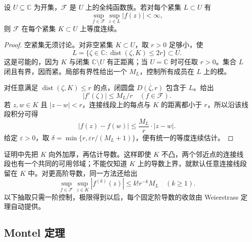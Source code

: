 \begin{lemma}\label{b3:lem:04-equicontinuity}
设 \(U\subseteq\mathbb C\) 为开集，\(\mathcal F\) 是 \(U\) 上的全纯函数族。若对每个紧集 \(L\subset U\) 有
\[
 \sup_{f\in\mathcal F}\sup_{z\in L}|f(z)|<\infty,
\]
则 \(\mathcal F\) 在每个紧集 \(K\subset U\) 上等度连续。
\end{lemma}
\begin{proof}
空紧集无须讨论。对非空紧集 \(K\subset U\)，取 \(r>0\) 足够小，使
\[
 L=\{\zeta\in\mathbb C:\operatorname{dist}(\zeta,K)\le2r\}
 \subset U.
\]
这是可能的，因为 \(K\) 与闭集 \(\mathbb C\setminus U\) 有正距离；当 \(U=\mathbb C\) 时可任取 \(r>0\)。集合 \(L\) 闭且有界，因而紧。局部有界性给出一个 \(M_L\)，控制所有成员在 \(L\) 上的模。

对任意满足 \(\operatorname{dist}(\zeta,K)\le r\) 的点，闭圆盘 \(\overline{D(\zeta,r)}\) 包含于 \(L\)。给出
\[
 |f'(\zeta)|\le M_L/r\quad(f\in\mathcal F).
\]
若 \(z,w\in K\) 且 \(|z-w|<r\)，连接线段上的每点与 \(K\) 的距离都小于 \(r\)，所以沿该线段积分可得
\[
 |f(z)-f(w)|
 \le \frac{M_L}{r}\cdot|z-w|.
\]
给定 \(\varepsilon>0\)，取
\(\delta=\min\{r,\varepsilon r/(M_L+1)\}\)，便有统一的等度连续估计。
\end{proof}
证明中先把 \(K\) 向外加厚，再估计导数。这样即使 \(K\) 不凸，两个邻近点的连接线段也有一个共同的可用邻域；不能仅知道 \(K\) 上的导数上界，就默认任意连接线段留在 \(K\) 中。对更高阶导数，同一方法还给出
\[
 \sup_{f\in\mathcal F}\sup_{z\in K}|f^{(k)}(z)|
 \le k!r^{-k}M_L\quad(k\ge1).
\]
以下抽取只需一阶控制，极限得到以后，每个固定阶导数的收敛由 Weierstrass 定理自动提供。

\subsection{Montel 定理}
\label{b3:subsec:040302}

